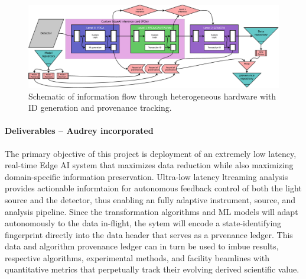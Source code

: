 \documentclass{article}
\begin{document}
\begin{figure}
	\centerline{\includegraphics[clip,width=.75\linewidth]{./figs/EdgeFlow.eps}}
	\caption{
		\label{fig::EdgeFlow}
		Schematic of information flow through heterogeneous hardware with ID generation and provenance tracking.
		}
\end{figure}

\paragraph{Deliverables -- Audrey incorporated}
The primary objective of this project is deployment of an extremely low latency, real-time Edge AI system that maximizes data reduction while also maximizing domain-specific information preservation. 
Ultra-low latency ltreaming analysis provides actionable informtaion for autonomous feedback control of both the light source and the detector, thus enabling an fully adaptive instrument, source, and analysis pipeline.
Since the transformation algorithms and ML models will adapt autonomously to the data in-flight, the sytem will encode a state-identifying fingerprint directly into the data header that serves as a prvenance ledger.
This data and algorithm provenance ledger can in turn be used to imbue results, respective algorithms, experimental methods, and facility beamlines with quantitative metrics that perpetually track their evolving derived scientific value.

\end{document}
